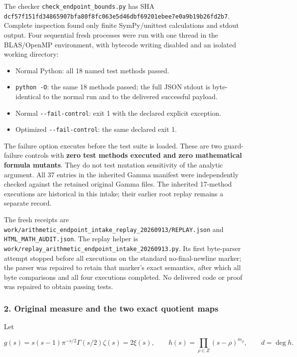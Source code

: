 The checker \nolinkurl{check_endpoint_bounds.py} has SHA \nolinkurl{dcf57f151fd34865907bfa80f8fc063e5d46dbf69201ebee7e0a9b19b26fd2b7}. Complete inspection found only finite SymPy/unittest calculations and stdout output. Four sequential fresh processes were run with one thread in the BLAS/OpenMP environment, with bytecode writing disabled and an isolated working directory:

\begin{itemize}
\tightlist
\item
  Normal Python: all 18 named test methods passed.
\item
  \texttt{python\ -O}: the same 18 methods passed; the full JSON stdout is byte-identical to the normal run and to the delivered successful payload.
\item
  Normal \texttt{-\/-fail-control}: exit 1 with the declared explicit exception.
\item
  Optimized \texttt{-\/-fail-control}: the same declared exit 1.
\end{itemize}

The failure option executes before the test suite is loaded. These are two guard-failure controls with \textbf{zero test methods executed and zero mathematical formula mutants}. They do not test mutation sensitivity of the analytic argument. All 37 entries in the inherited Gamma manifest were independently checked against the retained original Gamma files. The inherited 17-method executions are historical in this intake; their earlier root replay remains a separate record.

The fresh receipts are \nolinkurl{work/arithmetic_endpoint_intake_replay_20260913/REPLAY.json} and \nolinkurl{HTML_MATH_AUDIT.json}. The replay helper is \nolinkurl{work/replay_arithmetic_endpoint_intake_20260913.py}. Its first byte-parser attempt stopped before all executions on the standard no-final-newline marker; the parser was repaired to retain that marker's exact semantics, after which all byte comparisons and all four executions completed. No delivered code or proof was repaired to obtain passing tests.

\subsubsection{2. Original measure and the two exact quotient maps}\label{endpoint-arithmetic_intake--original-measure-and-the-two-exact-quotient-maps}

Let

\[
g(s)=s(s-1)\pi^{-s/2}\Gamma(s/2)\zeta(s)=2\xi(s),\qquad
h(s)=\prod_{\rho\in Z}(s-\rho)^{m_\rho},\qquad d=\deg h.
\]

